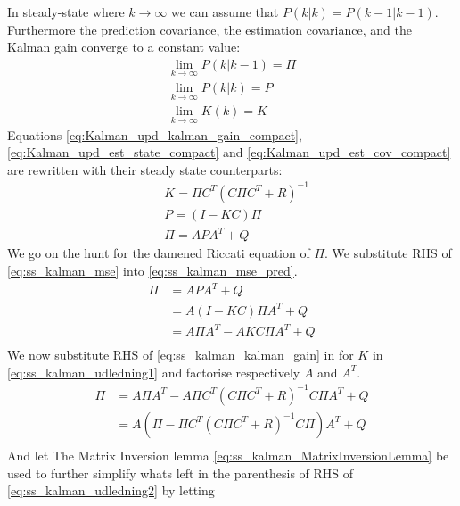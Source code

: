 In steady-state where $k \rightarrow \infty$ we can assume that ${P}(k|k) = {P}(k-1|k-1) $. Furthermore the prediction covariance, the estimation covariance, and the Kalman gain converge to a constant value:
\begin{equation}
	\begin{gathered}
		\lim_{k \to \infty}	{P}(k|k-1) =  \Pi \\
		\lim_{k \to \infty} {P}(k|k) = P \\
		\lim_{k \to \infty} {K}(k) = K
	\end{gathered}
\end{equation}
Equations \cref{eq:Kalman_upd_kalman_gain_compact}, \cref{eq:Kalman_upd_est_state_compact} and \cref{eq:Kalman_upd_est_cov_compact} are rewritten with their steady state counterparts:
\begin{align}
	& K = \Pi {C}^T ({C} \Pi {C}^T + {R})^{-1} \label{eq:ss_kalman_kalman_gain} \\
	& P = ({I} - K {C}) \Pi \label{eq:ss_kalman_mse} \\
	& \Pi = {A}P{A}^T + {Q} \label{eq:ss_kalman_mse_pred}
\end{align}
We go on the hunt for the damened Riccati equation of $\Pi$. We substitute RHS of \cref{eq:ss_kalman_mse} into \cref{eq:ss_kalman_mse_pred}.
\begin{equation}
	\begin{split}\label{eq:ss_kalman_udledning1}
		\Pi 	& = {A}P A^T + Q \\
		& = {A} ({I}-K{C}) \Pi {A}^T + {Q}\\
		& = {A} \Pi {A}^T - {A} K {C} \Pi  {A}^T + {Q}\\
		\end{split}
\end{equation}
We now substitute RHS of \cref{eq:ss_kalman_kalman_gain} in for $K$ in \cref{eq:ss_kalman_udledning1} and factorise respectively ${A}$ and $ {A}^T $.
\begin{equation}
	\begin{split}\label{eq:ss_kalman_udledning2}
		\Pi & = {A} \Pi {A}^T - {A} \Pi {C}^T ({C} \Pi {C}^T + {R})^{-1} {C} \Pi {A}^T + {Q}\\
		& = {A} (\Pi - \Pi {C}^T ({C} \Pi {C}^T + {R})^{-1} {C} \Pi) {A}^T + {Q}\\
	\end{split}
\end{equation}
And let The Matrix Inversion lemma \cref{eq:ss_kalman_MatrixInversionLemma} be used to further simplify whats left in the parenthesis of RHS of \cref{eq:ss_kalman_udledning2} by letting
